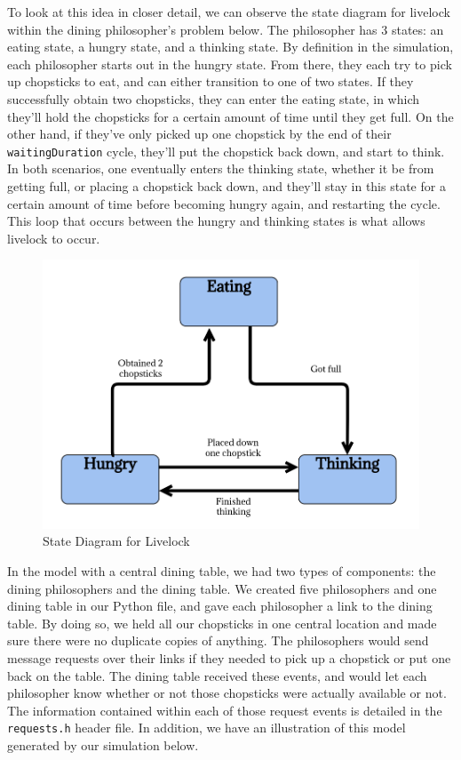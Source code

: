 \documentclass{article}
\begin{document}
To look at this idea in closer detail, we can observe the state diagram for livelock within the dining philosopher's problem below. The philosopher has 3 states: an eating state, a hungry state, and a thinking state.  By definition in the simulation, each philosopher starts out in the hungry state.  From there, they each try to pick up chopsticks to eat, and can either transition to one of two states.  If they successfully obtain two chopsticks, they can enter the eating state, in which they'll hold the chopsticks for a certain amount of time until they get full.  On the other hand, if they've only picked up one chopstick by the end of their \texttt{waitingDuration} cycle, they'll put the chopstick back down, and start to think.  In both scenarios, one eventually enters the thinking state, whether it be from getting full, or placing a chopstick back down, and they'll stay in this state for a certain amount of time before becoming hungry again, and restarting the cycle.  This loop that occurs between the hungry and thinking states is what allows livelock to occur.  

\begin{figure}[H]
    \centering
    \includegraphics[scale=0.3]{images/livelock-state-diagram.png}
    \caption{State Diagram for Livelock}
\end{figure}

In the model with a central dining table, we had two types of components: the dining philosophers and the dining table.  We created five 
philosophers and one dining table in our Python file, and gave each philosopher a link to the dining table.  By doing so, we held all 
our chopsticks in one central location and made sure there were no duplicate copies of anything.  The philosophers would send message requests 
over their links if they needed to pick up a chopstick or put one back on the table.  The dining table received these events, and would 
let each philosopher know whether or not those chopsticks were actually available or not.  The information contained within each of those request 
events is detailed in the \texttt{requests.h} header file.  In addition, we have an illustration of this model generated by our simulation below.
\end{document}

